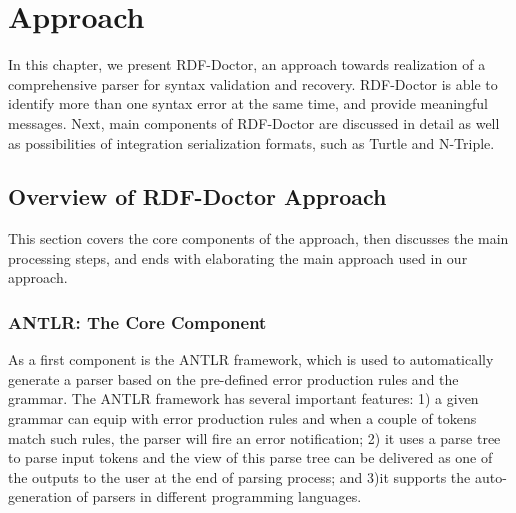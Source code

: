 \chapter{Approach}
\label{ch:approach}
In this chapter, we present RDF-Doctor, an approach towards realization of a comprehensive parser for syntax validation and recovery.
RDF-Doctor is able to identify more than one syntax error at the same time, and provide meaningful messages.
Next, main components of RDF-Doctor are discussed in detail as well as possibilities of integration serialization formats, such as Turtle and N-Triple.


\section{Overview of RDF-Doctor Approach}

This section covers the core components of the approach, then discusses the main processing steps, and ends with elaborating the main approach used in our approach. 

\subsection{ANTLR: The Core Component}

As a first component is the ANTLR framework, which is used to automatically generate a parser based on the pre-defined error production rules and the grammar.
The ANTLR framework has several important features: 1) a given grammar can equip with error production rules and when a couple of tokens match such rules, the parser will fire an error notification; 2) it uses a parse tree to parse input tokens and the view of this parse tree can be delivered as one of the outputs to the user at the end of parsing process; and 3)it supports the auto-generation of parsers in different programming languages.

